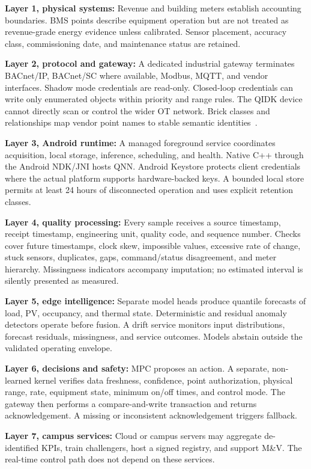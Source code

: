 \textbf{Layer 1, physical systems:} Revenue and building meters establish accounting boundaries. BMS points describe equipment operation but are not treated as revenue-grade energy evidence unless calibrated. Sensor placement, accuracy class, commissioning date, and maintenance status are retained.

\textbf{Layer 2, protocol and gateway:} A dedicated industrial gateway terminates BACnet/IP, BACnet/SC where available, Modbus, MQTT, and vendor interfaces. Shadow mode credentials are read-only. Closed-loop credentials can write only enumerated objects within priority and range rules. The QIDK device cannot directly scan or control the wider OT network. Brick classes and relationships map vendor point names to stable semantic identities~\cite{balaji2018brick}.

\textbf{Layer 3, Android runtime:} A managed foreground service coordinates acquisition, local storage, inference, scheduling, and health. Native C++ through the Android NDK/JNI hosts QNN. Android Keystore protects client credentials where the actual platform supports hardware-backed keys. A bounded local store permits at least 24 hours of disconnected operation and uses explicit retention classes.

\textbf{Layer 4, quality processing:} Every sample receives a source timestamp, receipt timestamp, engineering unit, quality code, and sequence number. Checks cover future timestamps, clock skew, impossible values, excessive rate of change, stuck sensors, duplicates, gaps, command/status disagreement, and meter hierarchy. Missingness indicators accompany imputation; no estimated interval is silently presented as measured.

\textbf{Layer 5, edge intelligence:} Separate model heads produce quantile forecasts of load, PV, occupancy, and thermal state. Deterministic and residual anomaly detectors operate before fusion. A drift service monitors input distributions, forecast residuals, missingness, and service outcomes. Models abstain outside the validated operating envelope.

\textbf{Layer 6, decisions and safety:} MPC proposes an action. A separate, non-learned kernel verifies data freshness, confidence, point authorization, physical range, rate, equipment state, minimum on/off times, and control mode. The gateway then performs a compare-and-write transaction and returns acknowledgement. A missing or inconsistent acknowledgement triggers fallback.

\textbf{Layer 7, campus services:} Cloud or campus servers may aggregate de-identified KPIs, train challengers, host a signed registry, and support M\&V. The real-time control path does not depend on these services.

